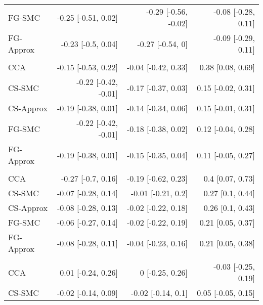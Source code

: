 \documentclass[
  12pt,
  a4paper,
]{article}
\begin{document}
\begin{longtable}[t]{lrrr}
\hspace{1em}FG-SMC & -0.25 [-0.51, 0.02] & -0.29 [-0.56, -0.02] & -0.08 [-0.28, 0.11]\\
\hspace{1em}FG-Approx & -0.23 [-0.5, 0.04] & -0.27 [-0.54, 0] & -0.09 [-0.29, 0.11]\\
\addlinespace[0.3em]
\multicolumn{4}{l}{\textbf{HCT-CI ($1-2$)}}\\
\hspace{1em}CCA & -0.15 [-0.53, 0.22] & -0.04 [-0.42, 0.33] & 0.38 [0.08, 0.69]\\
\hspace{1em}CS-SMC & -0.22 [-0.42, -0.01] & -0.17 [-0.37, 0.03] & 0.15 [-0.02, 0.31]\\
\hspace{1em}CS-Approx & -0.19 [-0.38, 0.01] & -0.14 [-0.34, 0.06] & 0.15 [-0.01, 0.31]\\
\hspace{1em}FG-SMC & -0.22 [-0.42, -0.01] & -0.18 [-0.38, 0.02] & 0.12 [-0.04, 0.28]\\
\hspace{1em}FG-Approx & -0.19 [-0.38, 0.01] & -0.15 [-0.35, 0.04] & 0.11 [-0.05, 0.27]\\
\addlinespace[0.3em]
\multicolumn{4}{l}{\textbf{HCT-CI ($\geq 3$)}}\\
\hspace{1em}CCA & -0.27 [-0.7, 0.16] & -0.19 [-0.62, 0.23] & 0.4 [0.07, 0.73]\\
\hspace{1em}CS-SMC & -0.07 [-0.28, 0.14] & -0.01 [-0.21, 0.2] & 0.27 [0.1, 0.44]\\
\hspace{1em}CS-Approx & -0.08 [-0.28, 0.13] & -0.02 [-0.22, 0.18] & 0.26 [0.1, 0.43]\\
\hspace{1em}FG-SMC & -0.06 [-0.27, 0.14] & -0.02 [-0.22, 0.19] & 0.21 [0.05, 0.37]\\
\hspace{1em}FG-Approx & -0.08 [-0.28, 0.11] & -0.04 [-0.23, 0.16] & 0.21 [0.05, 0.38]\\
\addlinespace[0.3em]
\multicolumn{4}{l}{\textbf{Interval diagnosis to alloHCT (decades)}}\\
\hspace{1em}CCA & 0.01 [-0.24, 0.26] & 0 [-0.25, 0.26] & -0.03 [-0.25, 0.19]\\
\hspace{1em}CS-SMC & -0.02 [-0.14, 0.09] & -0.02 [-0.14, 0.1] & 0.05 [-0.05, 0.15]\\

\end{longtable}
\end{document}
